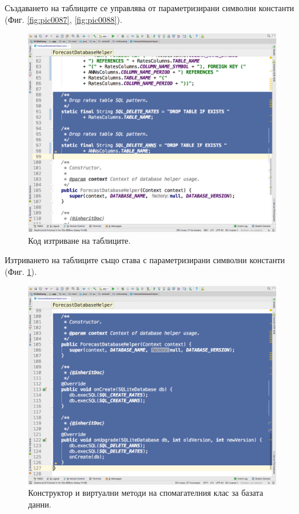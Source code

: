 \documentclass[book,14pt,oneside,openany]{memoir}
\begin{document}
Създаването на таблиците се управлява от параметризирани символни константи (Фиг. \ref{fig:pic0087}, \ref{fig:pic0088}).

\begin{figure}[h]
  \centering
  \includegraphics[height=0.45\pdfpageheight]{pic0089}
  \caption{Код изтриване на таблиците.}
\label{fig:pic0089}
\end{figure}
\FloatBarrier

Изтриването на таблиците също става с параметризирани символни константи (Фиг. \ref{fig:pic0089}).

\begin{figure}[h]
  \centering
  \includegraphics[height=0.45\pdfpageheight]{pic0090}
  \caption{Конструктор и виртуални методи на спомагателния клас за базата данни.}
\label{fig:pic0090}
\end{figure}
\FloatBarrier
\end{document}
